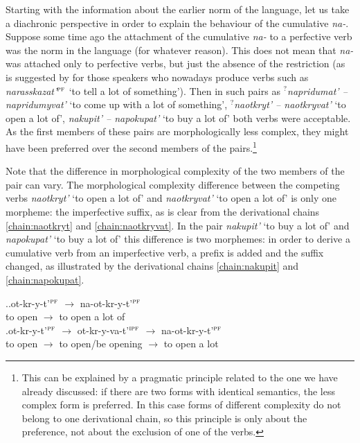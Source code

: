 Starting with the information about the earlier norm of the language, let us take a diachronic perspective in order to explain the behaviour of the cumulative \textit{na-}. Suppose some time ago the attachment of the cumulative \textit{na-} to a perfective verb was the norm in the language (for whatever reason). This does not mean that \textit{na-} was attached only to perfective verbs, but just the absence of the restriction (as is suggested by \citet{Tatevosov:13a} for those speakers who nowadays produce verbs such as \textit{narasskazat'}$^{\textsc{pf}}$ `to tell a lot of something'). Then in such pairs as \textit{$^?$napridumat' -- napridumyvat'} `to come up with a lot of something', \textit{$^?$naotkryt' -- naotkryvat'} `to open a lot of', \textit{nakupit' -- napokupat'} `to buy a lot of' both verbs were acceptable. As the first members of these pairs are morphologically less complex, they might have been preferred over the second members of the pairs.\footnote{This can be explained by a pragmatic principle related to the one we have already discussed: if there are two forms with identical semantics, the less complex form is preferred. In this case forms of different complexity do not belong to one derivational chain, so this principle is only about the preference, not about the exclusion of one of the verbs.} 

Note that the difference in morphological complexity of the two members of the pair can vary. The morphological complexity difference between the competing verbs \textit{naotkryt'} `to open a lot of' and \textit{naotkryvat'} `to open a lot of' is only one morpheme: the imperfective suffix, as is clear from the derivational chains \ref{chain:naotkryt} and \ref{chain:naotkryvat}. In the pair  \textit{nakupit'} `to buy a lot of' and  \textit{napokupat'} `to buy a lot of' this difference is two morphemes: in order to derive a cumulative verb from an imperfective verb, a prefix is added and the suffix changed, as illustrated by the derivational chains \ref{chain:nakupit} and \ref{chain:napokupat}.

\ex.\ag.\label{chain:naotkryt}ot-kr-y-t'$^{\textsc{pf}}$ $\rightarrow$ na-ot-kr-y-t'$^{\textsc{pf}}$\\
{to open} $\rightarrow$ {to open a lot of}\\
\bg.\label{chain:naotkryvat}ot-kr-y-t'$^{\textsc{pf}}$ $\rightarrow$ ot-kr-y-va-t'$^{\textsc{ipf}}$ $\rightarrow$ na-ot-kr-y-t'$^{\textsc{pf}}$\\
{to open} $\rightarrow$ {to open/be opening} $\rightarrow$ {to open a lot}\\

